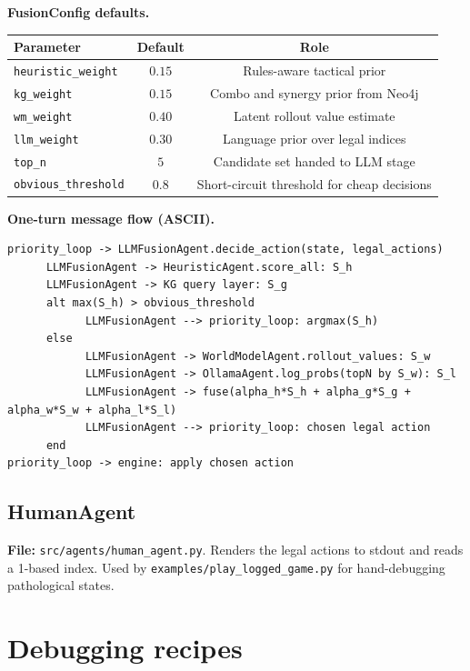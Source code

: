 \documentclass[11pt,a4paper]{article}
\begin{document}
\medskip\noindent\textbf{FusionConfig defaults.}
\begin{center}\small
\begin{tabular}{lcc}
\toprule
Parameter & Default & Role \\
\midrule
\texttt{heuristic\_weight} & $0.15$ & Rules-aware tactical prior \\
\texttt{kg\_weight} & $0.15$ & Combo and synergy prior from Neo4j \\
\texttt{wm\_weight} & $0.40$ & Latent rollout value estimate \\
\texttt{llm\_weight} & $0.30$ & Language prior over legal indices \\
\texttt{top\_n} & $5$ & Candidate set handed to LLM stage \\
\texttt{obvious\_threshold} & $0.8$ & Short-circuit threshold for cheap decisions \\
\bottomrule
\end{tabular}
\end{center}

\medskip\noindent\textbf{One-turn message flow (ASCII).}
\begin{lstlisting}[language={}]
priority_loop -> LLMFusionAgent.decide_action(state, legal_actions)
      LLMFusionAgent -> HeuristicAgent.score_all: S_h
      LLMFusionAgent -> KG query layer: S_g
      alt max(S_h) > obvious_threshold
            LLMFusionAgent --> priority_loop: argmax(S_h)
      else
            LLMFusionAgent -> WorldModelAgent.rollout_values: S_w
            LLMFusionAgent -> OllamaAgent.log_probs(topN by S_w): S_l
            LLMFusionAgent -> fuse(alpha_h*S_h + alpha_g*S_g + alpha_w*S_w + alpha_l*S_l)
            LLMFusionAgent --> priority_loop: chosen legal action
      end
priority_loop -> engine: apply chosen action
\end{lstlisting}

\subsection{HumanAgent}
\textbf{File:} \texttt{src/agents/human\_agent.py}.  Renders the legal
actions to stdout and reads a 1-based index.  Used by
\texttt{examples/play\_logged\_game.py} for hand-debugging pathological
states.

\section{Debugging recipes}
\end{document}
